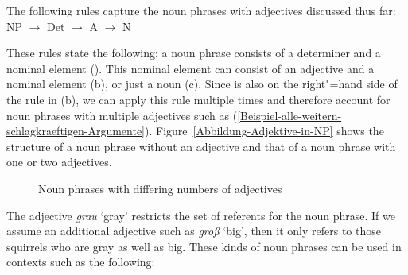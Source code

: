 %
The following rules capture the noun phrases with adjectives discussed thus far:
\eal
\label{NP-Regeln}
\ex NP $\to$ Det \nbar
\ex\label{NP-Regeln-Adj} \nbar $\to$ A \nbar
\ex\label{NP-Regeln-Nbar-N} \nbar $\to$ N
\zl

\noindent
These rules state the following: a noun phrase consists of a determiner and a nominal element (\nbar). This nominal element
can consist of an adjective and a nominal element (b), or just a noun (c). Since \nbar is also on the right"=hand side
of the rule in (b), we can apply this rule multiple times and therefore account for noun phrases with multiple adjectives such as
(\ref{Beispiel-alle-weitern-schlagkraeftigen-Argumente}). Figure~\vref{Abbildung-Adjektive-in-NP} shows the structure of a noun phrase
without an adjective and that of a noun phrase with one or two adjectives.
\begin{figure}
\scalebox{.9}{%
\begin{forest}
sm edges
[NP
   [Det [ein;a] ]
   [\nbar
      [N [Eichhörnchen;squirrel] ] ] ]
\end{forest}}
\hfill
\scalebox{.9}{%
\begin{forest}
sm edges
[NP
   [Det [ein;a] ]
   [\nbar
      [A [graues;gray] ]
      [\nbar
        [N [Eichhörnchen;squirrel] ] ] ] ]
\end{forest}}
%
\hfill
\scalebox{.9}{%
\begin{forest}
sm edges
[NP
  [Det [ein;a] ]
    [\nbar
    [A [großes;big] ]
       [\nbar
       [A [graues;gray] ]
         [\nbar
         [N [Eichhörnchen;squirrel] ] ] ] ] ]
\end{forest}}
%
\caption{\label{Abbildung-Adjektive-in-NP}Noun phrases with differing numbers of adjectives}
\end{figure}%
The adjective \emph{grau} `gray' restricts the set of referents for the noun phrase. If we assume an
additional adjective such as \emph{groß} `big', then it only refers to those squirrels who are gray
as well as big. These kinds of noun phrases can be used in contexts such as the following:

